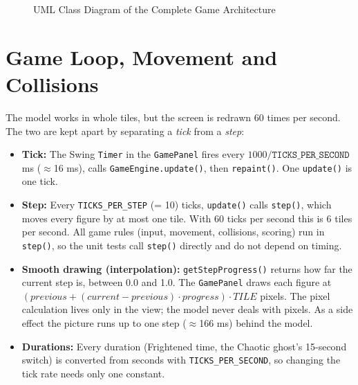 \documentclass[11pt, a4paper]{article}
\begin{document}
\begin{figure}[h!]
{
    } %
    \caption{UML Class Diagram of the Complete Game Architecture}
    \label{fig:uml_complete_diagram}
\end{figure}

\clearpage

\section{Game Loop, Movement and Collisions}
\label{sec:game_loop}
The model works in whole tiles, but the screen is redrawn 60 times per second. The two are kept apart by separating a \textit{tick} from a \textit{step}:
\begin{itemize}
    \item \textbf{Tick:} The Swing \texttt{Timer} in the \texttt{GamePanel} fires every $1000 / \texttt{TICKS\_PER\_SECOND}$ ms ($\approx$16 ms), calls \texttt{GameEngine.update()}, then \texttt{repaint()}. One \texttt{update()} is one tick.
    \item \textbf{Step:} Every \texttt{TICKS\_PER\_STEP} (= 10) ticks, \texttt{update()} calls \texttt{step()}, which moves every figure by at most one tile. With 60 ticks per second this is 6 tiles per second. All game rules (input, movement, collisions, scoring) run in \texttt{step()}, so the unit tests call \texttt{step()} directly and do not depend on timing.
    \item \textbf{Smooth drawing (interpolation):} \texttt{getStepProgress()} returns how far the current step is, between 0.0 and 1.0. The \texttt{GamePanel} draws each figure at $(\textit{previous} + (\textit{current} - \textit{previous}) \cdot \textit{progress}) \cdot \textit{TILE}$ pixels. The pixel calculation lives only in the view; the model never deals with pixels. As a side effect the picture runs up to one step ($\approx$166 ms) behind the model.
    \item \textbf{Durations:} Every duration (Frightened time, the Chaotic ghost's 15-second switch) is converted from seconds with \texttt{TICKS\_PER\_SECOND}, so changing the tick rate needs only one constant.
\end{itemize}
\end{document}
